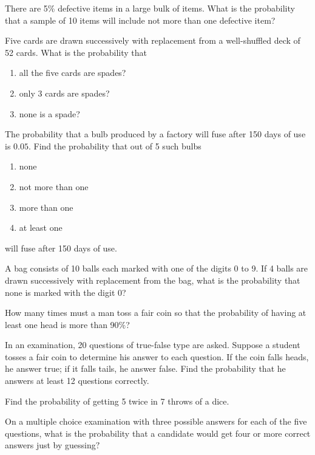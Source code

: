 \solution

\item There are 5\% defective items in a large bulk of items. What is the probability that a sample of 10 items will include not more than one defective item?
	\\
\solution
\item Five cards are drawn successively with replacement from a well-shuffled deck
of 52 cards. What is the probability that
\begin{enumerate}
    \item all the five cards are spades?
    \item only 3 cards are spades?
    \item none is a spade?
\end{enumerate}
\solution

\item The probability that a bulb produced by a factory will fuse after 150 days of use
is $0.05$. Find the probability that out of 5 such bulbs
\begin{enumerate}
\item  none
\item not more than one
\item more than one
\item at least one
\end{enumerate}
will fuse after 150 days of use.
\\

\item A bag consists of 10 balls each marked with one of the digits 0 to 9. If 4 balls are drawn successively with replacement from the bag, what is the probability that none is marked with the digit 0?
\\
\solution

\item How many times must a man toss a fair coin so that the probability of having at least one head is more than 90\%?
\\

\item In an examination, 20 questions of true-false type are asked. Suppose a student tosses a fair coin to determine his answer to each question. If the coin falls heads, he answer true; if it falls tails, he answer false. Find the probability that he answers at least 12 questions correctly.\\
\solution
\item Find the probability of getting 5 twice in 7 throws of a dice.\\
\solution
\item On a multiple choice examination with three possible answers for each of the five questions, what is the probability that a candidate would get four or more correct answers just by guessing$?$
